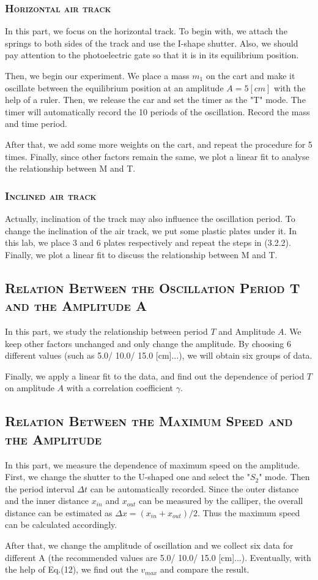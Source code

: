 \documentclass[a4paper,12pt]{article}
\begin{document}
\subsubsection{\textsc{Horizontal air track}}
In this part, we focus on the horizontal track. To begin with, we attach the springs to both sides of the track and use the I-shape shutter. Also, we should pay attention to the photoelectric gate so that it is in its equilibrium position.
\par Then, we begin our experiment. We place a mass $m_1$ on the cart and make it oscillate between the equilibrium position at an amplitude $A = 5 [cm]$ with the help of a ruler. Then, we release the car and set the timer as the "T" mode. The timer will automatically record the 10 periods of the oscillation. Record the mass and time period.
\par After that, we add some more weights on the cart, and repeat the procedure for 5 times. Finally, since  other factors remain the same, we plot a linear fit to analyse the relationship between M and T.  
\subsubsection{\textsc{Inclined air track}}
Actually, inclination of the track may also influence the oscillation period. To change the inclination of the air track, we put some plastic plates under it. In this lab, we place 3 and 6 plates respectively and repeat the steps in (3.2.2). Finally, we plot a linear fit to discuss the relationship between M and T.

\subsection{\textsc{Relation Between the Oscillation Period T and the Amplitude A}}
In this part, we study the relationship between period $T$ and Amplitude $A$. We keep other factors unchanged and only change the amplitude. By choosing 6 different values (such as 5.0/ 10.0/ 15.0 [cm]...), we will obtain six groups of data. 
\par Finally, we apply a linear fit to the data, and find out the dependence of period $T$ on amplitude $A$ with a correlation coefficient $\gamma$.

\subsection{\textsc{Relation Between the Maximum Speed and the Amplitude}}
In this part, we measure the dependence of maximum speed on the amplitude. First, we change the shutter to the U-shaped one and select the "$S_2$" mode. Then the period interval $\Delta t$ can be automatically recorded. Since the outer distance and the inner distance $x_{in}$ and $x_{out}$ can be measured by the calliper, the overall distance can be estimated as $\Delta x = (x_{in} + x_{out})/2$. Thus the maximum speed can be calculated accordingly.
\par After that, we change the amplitude of oscillation and we collect six data for different A (the recommended values are 5.0/ 10.0/ 15.0 [cm]...). Eventually, with the help of Eq.(12), we find out the $v_{max}$ and compare the result.
\end{document}
